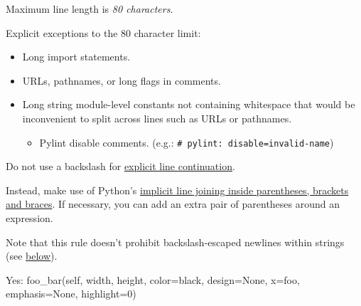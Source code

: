 \documentclass[
]{article}
\newenvironment{Shaded}{}{}
\newcommand{\DecValTok}[1]{\textcolor[rgb]{0.25,0.63,0.44}{#1}}
\newcommand{\NormalTok}[1]{#1}
\newcommand{\OperatorTok}[1]{\textcolor[rgb]{0.40,0.40,0.40}{#1}}
\newcommand{\StringTok}[1]{\textcolor[rgb]{0.25,0.44,0.63}{#1}}
\newcommand{\VariableTok}[1]{\textcolor[rgb]{0.10,0.09,0.49}{#1}}
\providecommand{\tightlist}{%
  \setlength{\itemsep}{0pt}\setlength{\parskip}{0pt}}
\begin{document}
Maximum line length is \emph{80 characters}.

Explicit exceptions to the 80 character limit:

\begin{itemize}
\tightlist
\item
  Long import statements.
\item
  URLs, pathnames, or long flags in comments.
\item
  Long string module-level constants not containing whitespace that
  would be inconvenient to split across lines such as URLs or pathnames.

  \begin{itemize}
  \tightlist
  \item
    Pylint disable comments. (e.g.:
    \texttt{\#\ pylint:\ disable=invalid-name})
  \end{itemize}
\end{itemize}

Do not use a backslash for
\href{https://docs.python.org/3/reference/lexical_analysis.html\#explicit-line-joining}{explicit
line continuation}.

Instead, make use of Python's
\href{http://docs.python.org/reference/lexical_analysis.html\#implicit-line-joining}{implicit
line joining inside parentheses, brackets and braces}. If necessary, you
can add an extra pair of parentheses around an expression.

Note that this rule doesn't prohibit backslash-escaped newlines within
strings (see \hyperref[strings]{below}).

\begin{samepage}
\begin{Shaded}
\begin{Highlighting}[]
\NormalTok{Yes: foo\_bar(}\VariableTok{self}\NormalTok{, width, height, color}\OperatorTok{=}\StringTok{\textquotesingle{}black\textquotesingle{}}\NormalTok{, design}\OperatorTok{=}\VariableTok{None}\NormalTok{, x}\OperatorTok{=}\StringTok{\textquotesingle{}foo\textquotesingle{}}\NormalTok{,}
\NormalTok{             emphasis}\OperatorTok{=}\VariableTok{None}\NormalTok{, highlight}\OperatorTok{=}\DecValTok{0}\NormalTok{)}
\end{Highlighting}
\end{Shaded}
\end{samepage}
\end{document}
